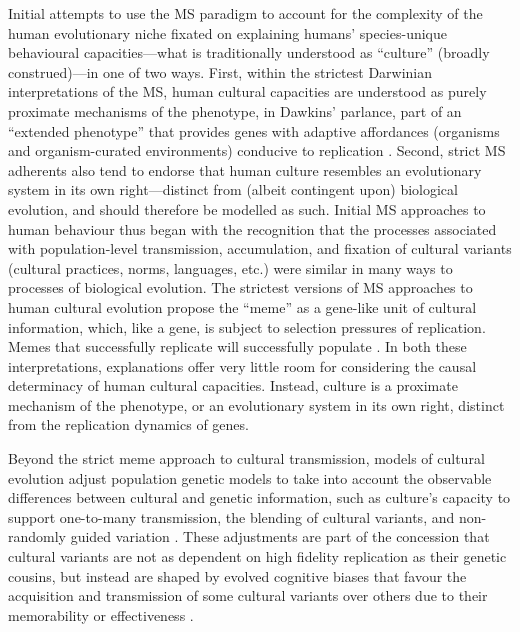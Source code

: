 
 Initial attempts to use the MS paradigm to account for the complexity of the human evolutionary niche fixated on explaining humans' species-unique behavioural capacities---what is traditionally understood as ``culture'' (broadly construed)---in one of two ways.  First, within the strictest Darwinian interpretations of the MS, human cultural capacities are understood as purely proximate mechanisms of the phenotype, in Dawkins' parlance, part of an ``extended phenotype'' that provides genes with adaptive affordances (organisms and organism-curated environments) conducive to replication \citep{Dawkins1982}. Second, strict MS adherents also tend to endorse that human culture resembles an evolutionary system in its own right---distinct from (albeit contingent upon) biological evolution, and should therefore be modelled as such. Initial MS approaches to human behaviour thus began with the recognition that the processes associated with population-level transmission, accumulation, and fixation of cultural variants (cultural practices, norms, languages, etc.) were similar in many ways to processes of biological evolution. The strictest versions of MS approaches to human cultural evolution propose the ``meme'' as a gene-like unit of cultural information, which, like a gene, is subject to selection pressures of replication.  Memes that successfully replicate will successfully populate \citep{Dawkins1976}.  In both these interpretations, explanations offer very little room for considering the causal determinacy of human cultural capacities. Instead, culture is a proximate mechanism of the phenotype, or an evolutionary system in its own right, distinct from the replication dynamics of genes.

Beyond the strict meme approach to cultural transmission, models of cultural evolution adjust population genetic models to take into account the observable differences between cultural and genetic information, such as culture's capacity to support one-to-many transmission, the blending of cultural variants, and non-randomly guided variation \citep{Cavalli-Sforza1981,Boyd1988}.  These adjustments are part of the concession that cultural variants are not as dependent on high fidelity replication as their genetic cousins, but instead are shaped by evolved cognitive biases that favour the acquisition and transmission of some cultural variants over others due to their memorability or effectiveness \citep{Henrich2007}.

